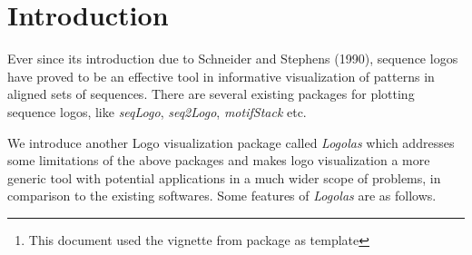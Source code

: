 \documentclass[12pt]{article}\usepackage[]{graphicx}\usepackage[usenames,dvipsnames]{color}
\author{Kushal K Dey, Dongyue Xie, Matthew Stephens  \\[1em]
\small{Dept. of Statistics, The University of Chicago} \mbox{ }\\
\small{\texttt{$^*$Correspondending Email: kkdey@uchicago.edu}}}
\newcommand{\Logolas}{\textit{Logolas}}
\begin{document}
\maketitle

\begin{abstract}
\vspace{1em}
Logo plots are popular in genomic studies for sequence alignment and motif detection. However, logo plots have been restrictive in its scope due to limited size of the library of symbols used by logo plotting tools and packages  and the lack of flexibility in extending it to other applications. In this package, we provide an easy and flexible interface for the user to plot logos. More importantly, we extend the library of logos from A, C, T, G (library of symbols in seqLogo) and English alphabets (library of symbols in RWebLogo, motifStack) to include numbers and alpha-numeric strings with provision for punctuations and arrows. It also provides the user with a simple graphical interface to create her own logo and add to her personal library.
In this vignette, we discuss a number of applications in genomics and beyond where such flexible logo plots can be effective in visualizing patterns.

\vspace{1em}
\textbf{\Logolas{} version:} 1.1.2 \footnote{This document used the vignette from \Bioconductor{} package  as  template}
\end{abstract}



\newpage

\tableofcontents

\section{Introduction}

Ever since its introduction due to Schneider and Stephens (1990), sequence logos have proved to be an effective tool in informative visualization of patterns in aligned sets of sequences. There are several existing packages for plotting sequence logos, like \textit{seqLogo}, \textit{seq2Logo}, \textit{motifStack} etc.

We introduce another Logo visualization package called \textit{Logolas} which addresses some limitations of the above packages and makes logo visualization a more generic tool with potential applications in a much wider scope of problems, in comparison to the existing softwares. Some features of \textit{Logolas} are as follows.
\end{document}
